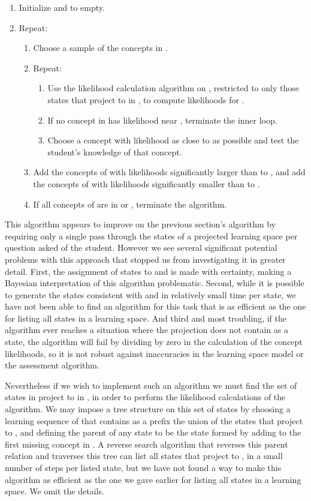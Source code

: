 \documentclass[11pt]{llncs}
\begin{document}
{\begin{enumerate}
\item Initialize  and  to empty.
\item Repeat:
\begin{enumerate}
\item Choose a sample  of the concepts in .
\item Repeat:
\begin{enumerate}
\item Use the likelihood calculation algorithm on , restricted to
only those states that project to  in , to compute likelihoods for .
\item If no concept in  has likelihood near , terminate the inner loop.
\item Choose a concept with likelihood as close to  as possible and test the student's knowledge of that concept.
\end{enumerate}
\item Add the concepts of  with likelihoods significantly larger than  to , and add the concepts of  with likelihoods significantly smaller than  to .
\item If all concepts of  are in  or , terminate the algorithm.
\end{enumerate}
\end{enumerate}

This algorithm appears to improve on the previous section's algorithm by requiring only a single
pass through the states of a projected learning space per question asked of the student. However we see several significant potential problems with this approach that stopped us from investigating it in greater detail. First, the assignment of states to  and  is made with certainty, making a Bayesian interpretation of this algorithm problematic. Second, while it is possible to generate the states consistent with  and  in relatively small time per state, we have not been able to find an algorithm for this task that is as efficient as the one for listing all states in a learning space. And third and most troubling, if the algorithm ever reaches a situation where the projection  does not contain  as a state, the algorithm will fail by dividing by zero in the calculation of the concept likelihoods, so it is not robust against inaccuracies in the learning space model or the assessment algorithm.

Nevertheless if we wish to implement such an algorithm we must find the set of states in  project to  in , in order to perform the likelihood calculations of the algorithm.
We may impose a tree structure on this set of states by choosing a learning sequence  of  that contains as a prefix the union of the states that project to , and defining the parent of any state  to be the state formed by adding to  the first missing concept in . A reverse search algorithm that reverses this parent relation and traverses this tree can list all states that project to , in a small number of steps per listed state, but we have not found a way to make this algorithm as efficient as the one we gave earlier for listing all states in a learning space. We omit the details.

}
\end{document}
